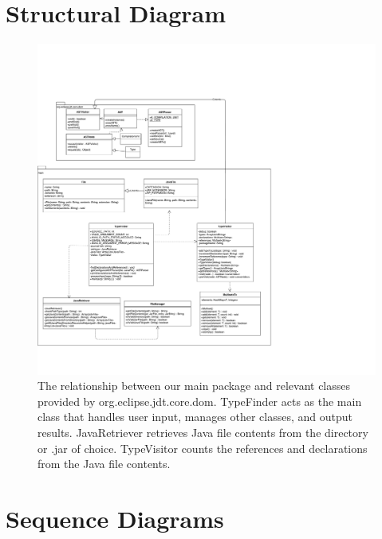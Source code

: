 \documentclass[12p]{article}
\begin{document}
\section{Structural Diagram}
\begin{figure}[H]
  \includegraphics[width=1.00\textwidth]{StructuralDiagramIteration_2.pdf}
  \caption{The relationship between our main package and relevant classes provided by org.eclipse.jdt.core.dom. TypeFinder acts as the main class that handles user input, manages other classes, and output results. JavaRetriever retrieves Java file contents from the directory or .jar of choice. TypeVisitor counts the references and declarations from the Java file contents.} %
  \label{fig:structural}
\end{figure}


\section{Sequence Diagrams}
\end{document}
